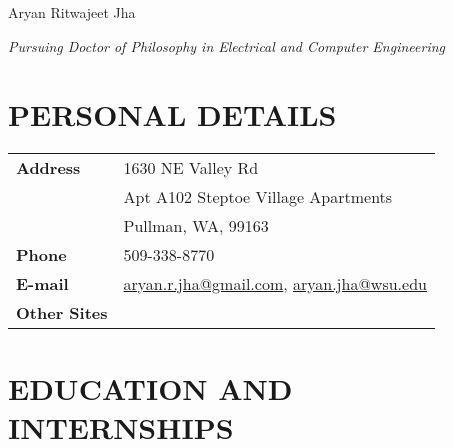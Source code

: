 \documentclass[paper=a4,fontsize=11pt]{scrartcl} %
\newcommand{\sepspace}{\vspace*{1em}}		%
\newcommand{\NewPart}[1]{\section*{\uppercase{#1}}}
\begin{document}
\Huge {} \hfill Aryan Ritwajeet Jha
\par \normalsize \normalfont


\large {}\hfill \textit{Pursuing Doctor of Philosophy in Electrical and Computer Engineering}
\par \normalsize \normalfont

\sepspace


\NewPart{Personal Details}
	\begin{table}[ht]
			\begin{tabular}{l l}
				\textbf{Address} & 1630 NE Valley Rd \\
				{} & Apt A102 Steptoe Village Apartments \\
				{} & Pullman, WA, 99163\\
				\textbf{Phone} & 509-338-8770 \\
				\textbf{E-mail} & \href{mailto:aryan.r.jha@gmail.com}{aryan.r.jha@gmail.com}, \href{mailto:aryan.jha@wsu.edu}{aryan.jha@wsu.edu} \\
				\textbf{Other Sites} & \href{https://www.linkedin.com/in/aryan-r-jha}{\textcolor{linkedinblue}{\faLinkedin}} \href{https://Github.com/Realife-Brahmin}{\textcolor{github}{\faGithub}}
			\end{tabular}
	\end{table}
	

\NewPart{Education and Internships}{}
\end{document}

